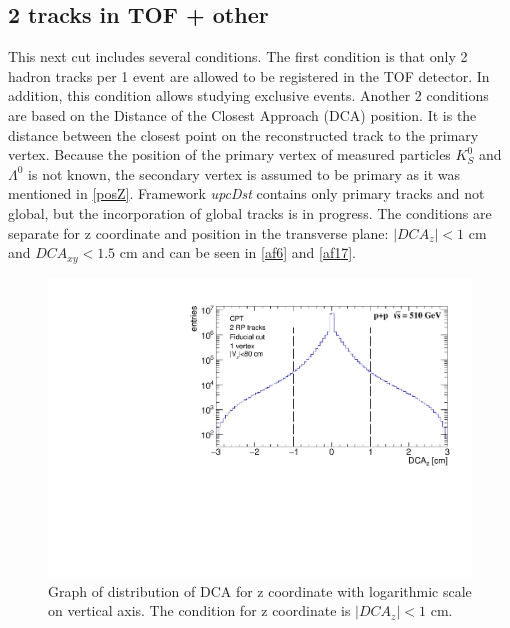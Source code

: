\subsection{2 tracks in TOF + other}
This next cut includes several conditions. The first condition is that only 2 hadron tracks per 1 event are allowed to be registered in the TOF detector. In addition, this condition allows studying exclusive events.
\newline
Another 2 conditions are based on the Distance of the Closest Approach (DCA) position. It is the distance between the closest point on the reconstructed track to the primary vertex. Because the position of the primary vertex of measured particles $K^0_S$ and $\Lambda^0$ is not known, the secondary vertex is assumed to be primary as it was mentioned in \autoref{posZ}. Framework \textit{upcDst} contains only primary tracks and not global, but the incorporation of global tracks is in progress. The conditions are separate for z coordinate and position in the transverse plane: $|DCA_z| < 1$ cm and $DCA_{xy} < 1.5$ cm and can be seen in \autoref{af6} and \autoref{af17}. 
\FloatBarrier
\begin{figure}[ht]
    \centering
    \includegraphics[width=1\textwidth]{figures/hDcaZ.pdf}
    \caption[Distribution of z coordinate of DCA]{Graph of distribution of DCA for z coordinate with logarithmic scale on vertical axis. The condition for z coordinate is $|DCA_z| < 1$ cm.}
    \label{af6}
\end{figure}
\FloatBarrier
\FloatBarrier
